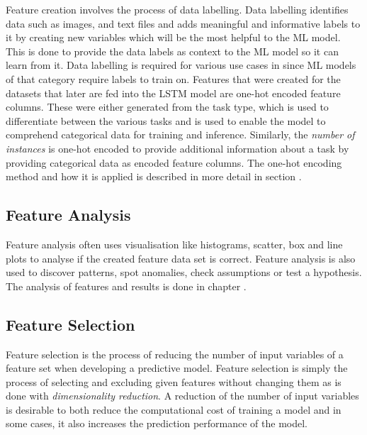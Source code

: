     Feature creation involves the process of data labelling.
    Data labelling identifies data such as images, and text files and adds meaningful and informative labels to it by creating new variables which will be the most helpful to the ML model. This is done to provide the data labels as context to the ML model so it can learn from it. Data labelling is required for various use cases in  since ML models of that category require labels to train on. Features that were created for the datasets that later are fed into the LSTM model are one-hot encoded feature columns. These were either generated from the task type, which is used to differentiate between the various tasks and is used to enable the model to comprehend categorical data for training and inference. Similarly, the \emph{number of instances} is one-hot encoded to provide additional information about a task by providing categorical data as encoded feature columns. The one-hot encoding method and how it is applied is described in more detail in section .

  \subsection{Feature Analysis}
  \label{sec:feature-analysis-preprocessing-architecture}
  
    Feature analysis often uses visualisation like histograms, scatter, box and line plots to analyse if the created feature data set is correct. Feature analysis is also used to discover patterns, spot anomalies, check assumptions or test a hypothesis.
    The analysis of features and results is done in chapter .

  \subsection{Feature Selection}
  \label{sec:feature-selection-data-preprocessing-architecture}

    Feature selection is the process of reducing the number of input variables of a feature set when developing a predictive model.
    Feature selection is simply the process of selecting and excluding given features without changing them as is done with \emph{dimensionality reduction}.
    A reduction of the number of input variables is desirable to both reduce the computational cost of training a model and in some cases, it also increases the prediction performance of the model.


